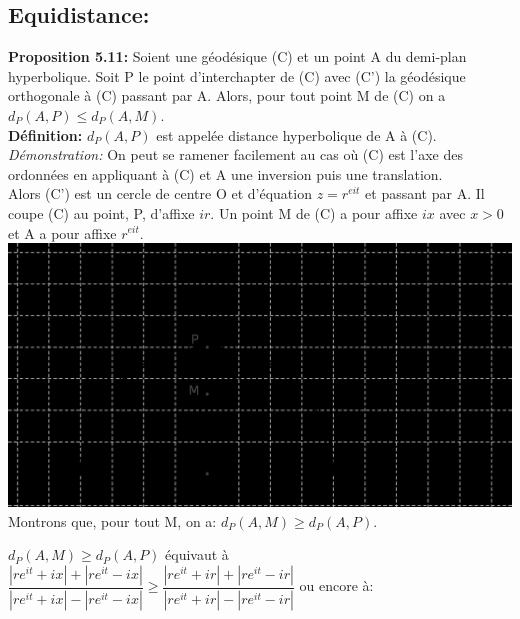 \documentclass[a4paper, 12pt, twoside]{book}
\begin{document}
 

\subsection{Equidistance:}






 
 \textbf{Proposition 5.11:} Soient une géodésique (C) et un point A du demi-plan hyperbolique. Soit P le point d'interchapter de (C) avec (C') la géodésique orthogonale à (C) passant par A. Alors, pour tout point M de (C) on a $d_{P}(A,P)\leq d_{P}(A,M)$.\\
 
 \textbf{Définition:}  $d_{P}(A,P)$ est appelée distance hyperbolique de A à (C).\\
 
 \textit{Démonstration:} On peut se ramener facilement au cas où (C) est l'axe des ordonnées en appliquant à (C) et A une inversion puis une translation. \\
 
 Alors (C') est un cercle de centre O et d'équation $z=r^{eit}$ et passant par A. Il coupe (C) au point, P, d'affixe $ir$. Un point M de (C) a pour affixe $ix$ avec $x>0$ et A a pour affixe $r^{eit}$.\\
 
  
 \includegraphics[scale=0.7]{figures/hyper43.eps}\\
 
 
 Montrons que, pour tout M, on a: $d_{P}(A,M)\geq d_{P}(A,P)$.\
 
 $d_{P}(A,M)\geq d_{P}(A,P)$ équivaut à $\dfrac{|re^{it}+ix|+|re^{it}-ix|}{|re^{it}+ix|-|re^{it}-ix|}\geq \dfrac{|re^{it}+ir|+|re^{it}-ir|}{|re^{it}+ir|-|re^{it}-ir|}$ ou encore à:\\
 
\end{document}

